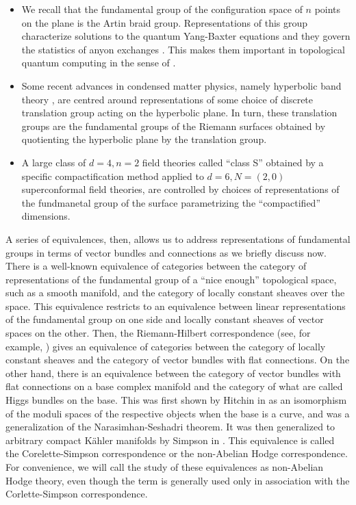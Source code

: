 \documentclass[11pt]{amsart}
\begin{document}
\begin{itemize}
\item We recall that the fundamental group of the configuration space of $n$
points on the plane is the Artin braid group. Representations of this
group characterize solutions to the quantum Yang-Baxter equations
\cite{BirmanKnotThry} and they govern the statistics of anyon exchanges
\cite{GoldinAnyons}. This makes them important in topological quantum computing
\cite{KauffmanBraidRepQGates} in the sense of \cite{TopPhasesQC}.

\item Some recent advances in condensed matter physics, namely hyperbolic band
theory \cites{HyperbolicBandTheory, HypBloch}, are centred around
representations of some choice of discrete translation group acting on the
hyperbolic plane. In turn, these translation groups are the fundamental groups
of the Riemann surfaces obtained by quotienting the hyperbolic plane by the
translation group.

\item A large class of $d = 4, n = 2$ field theories called ``class S''
\cite{ClassS} obtained by a specific compactification method applied to
$d = 6, N = (2, 0)$ superconformal field theories, are controlled by
choices of representations of the fundmanetal group of the surface
parametrizing the ``compactified'' dimensions.
\end{itemize}

A series of equivalences, then, allows us to address representations of
fundamental groups in terms of vector bundles and connections as we briefly
discuss now. There is a well-known equivalence of categories between the
category of representations of the fundamental group of a ``nice enough''
topological space, such as a smooth manifold, and the category of locally
constant sheaves over the space. This equivalence restricts to an equivalence
between linear representations of the fundamental group on one side and locally
constant sheaves of vector spaces on the other. Then, the Riemann-Hilbert
correspondence (see, for example, \cite[35]{LanglandsIntro}) gives an
equivalence of categories between the category of locally constant sheaves and
the category of vector bundles with flat connections. On the other hand, there
is an equivalence between the category of vector bundles with flat connections
on a base complex manifold and the category of what are called Higgs bundles on
the base. This was first shown by Hitchin in \cite{SelfDualityEqn} as an
isomorphism of the moduli spaces of the respective objects when the base is a
curve, and was a generalization of the Narasimhan-Seshadri theorem. It was then
generalized to arbitrary compact K\"ahler manifolds by Simpson in
\cite{HiggsLocSys}. This equivalence is called the Corelette-Simpson
correspondence or the non-Abelian Hodge correspondence. For convenience, we will
call the study of these equivalences as non-Abelian Hodge theory, even though
the term is generally used only in association with the Corlette-Simpson
correspondence.
\end{document}
